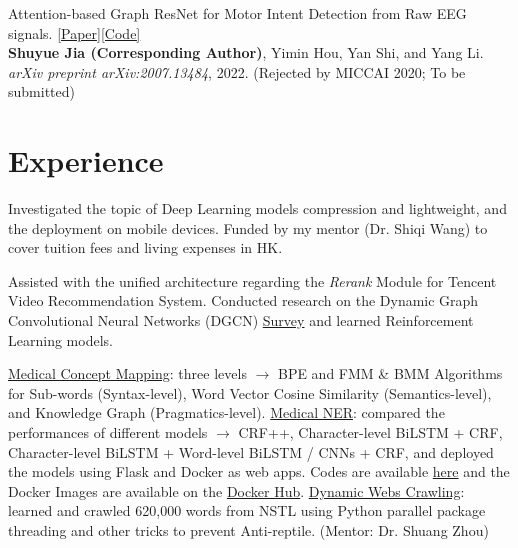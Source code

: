 \documentclass{my_cv}
\begin{document}
\hspace*{\fill}

\workitemsone
{Attention-based Graph ResNet for Motor Intent Detection from Raw EEG signals. \href{https://arxiv.org/abs/2007.13484}{[Paper]}\href{https://github.com/SuperBruceJia/EEG-DL}{[Code]}\\
	\textbf{Shuyue Jia (Corresponding Author)}, Yimin Hou, Yan Shi, and Yang Li.\\
	\emph{arXiv preprint arXiv:2007.13484}, 2022. (Rejected by MICCAI 2020; To be submitted)
}
	
\hspace*{\fill}

\section{Experience}

\workitemstwo
{Investigated the topic of Deep Learning models compression and lightweight, and the deployment on mobile devices.}
{Funded by my mentor (Dr. Shiqi Wang) to cover tuition fees and living expenses in HK.}

\hspace*{\fill}

\workitemstwo
{Assisted with the unified architecture regarding the \emph{Rerank} Module for Tencent Video Recommendation System.}
{Conducted research on the Dynamic Graph Convolutional Neural Networks (DGCN) \href{https://shuyuej.com/files/Dynamic-GCN-Survey.pdf}{Survey} and learned Reinforcement Learning models.}

\hspace*{\fill} 

\workitemsthree
{\href{https://github.com/SuperBruceJia/Medical-Concept-Mapping}{Medical Concept Mapping}: three levels $\rightarrow$ BPE and FMM \& BMM Algorithms for Sub-words (Syntax-level), Word Vector Cosine Similarity (Semantics-level), and Knowledge Graph (Pragmatics-level).}
{\href{https://github.com/SuperBruceJia/MedicalNER}{Medical NER}: compared the performances of different models $\rightarrow$ CRF++, Character-level BiLSTM + CRF, Character-level BiLSTM + Word-level BiLSTM / CNNs + CRF, and deployed the models using Flask and Docker as web apps. Codes are available \href{https://github.com/SuperBruceJia/pytorch-flask-deploy-webapp}{here} and the Docker Images are available on the \href{https://hub.docker.com/u/shuyuej}{Docker Hub}.}
{\href{https://github.com/SuperBruceJia/dynamic-web-crawlering-python}{Dynamic Webs Crawling}: learned and crawled 620,000 words from NSTL using Python parallel package threading and other tricks to prevent Anti-reptile. (Mentor: Dr. Shuang Zhou)}
\end{document}

